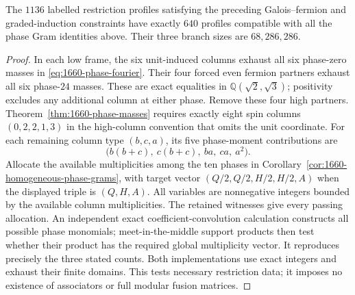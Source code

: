 \begin{corollary}
\label{cor:1660-phase-640}
The $1136$ labelled restriction profiles satisfying the preceding
Galois--fermion and graded-induction constraints have exactly $640$
profiles compatible with all the phase Gram identities above. Their
three branch sizes are $68,286,286$.
\end{corollary}
\begin{proof}
In each low frame, the six unit-induced columns exhaust all six
phase-zero masses in \eqref{eq:1660-phase-fourier}. Their four forced
even fermion partners exhaust all six phase-$24$ masses. These are
exact equalities in $\mathbb Q(\sqrt2,\sqrt3)$; positivity excludes
any additional column at either phase. Remove these four high partners.
Theorem~\ref{thm:1660-phase-masses} requires exactly eight
spin columns $(0,2,2,1,3)$ in the high-column convention that omits the
unit coordinate. For each remaining column type $(b,c,a)$, its five
phase-moment contributions are
\[
 \bigl(b(b+c),\ c(b+c),\ ba,\ ca,\ a^2\bigr).
\]
Allocate the available multiplicities among the ten phases in
Corollary~\ref{cor:1660-homogeneous-phase-grams}, with target vector
$(Q/2,Q/2,H/2,H/2,A)$ when the displayed triple is $(Q,H,A)$.
All variables are nonnegative integers bounded by the available
column multiplicities. The retained witnesses give every passing
allocation. An independent exact coefficient-convolution calculation
constructs all possible phase monomials; meet-in-the-middle support
products then test whether their product has the required global
multiplicity vector. It reproduces precisely the three stated counts.
Both implementations use exact integers and exhaust their finite domains.
This tests necessary restriction data; it imposes no existence of
associators or full modular fusion matrices.
\end{proof}

